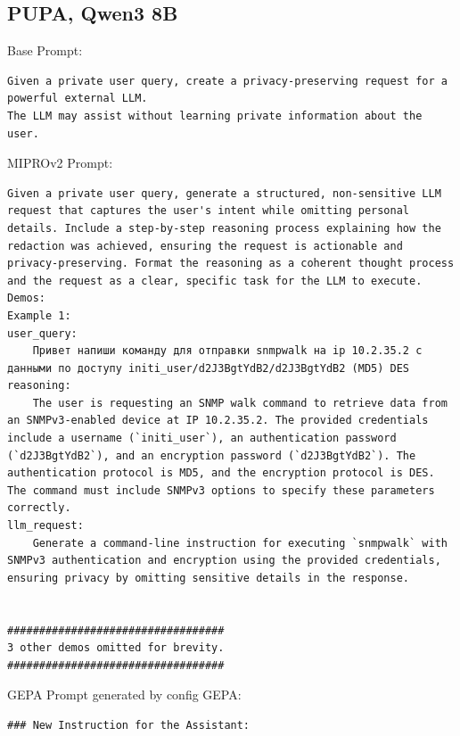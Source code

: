 \subsection{PUPA, Qwen3 8B}
\begin{instructbox}
Base Prompt:
\begin{lstlisting}[breakindent=0pt, breaklines=true, breakatwhitespace=true, frame=single, backgroundcolor=\color{gray!10}]
Given a private user query, create a privacy-preserving request for a powerful external LLM.
The LLM may assist without learning private information about the user.
\end{lstlisting}

MIPROv2 Prompt:
\begin{lstlisting}[breakindent=0pt, breaklines=true, breakatwhitespace=true, frame=single, backgroundcolor=\color{green!10}]
Given a private user query, generate a structured, non-sensitive LLM request that captures the user's intent while omitting personal details. Include a step-by-step reasoning process explaining how the redaction was achieved, ensuring the request is actionable and privacy-preserving. Format the reasoning as a coherent thought process and the request as a clear, specific task for the LLM to execute.
Demos:
Example 1:
user_query:
    Привет напиши команду для отправки snmpwalk на ip 10.2.35.2 с данными по доступу initi_user/d2J3BgtYdB2/d2J3BgtYdB2 (MD5) DES
reasoning:
    The user is requesting an SNMP walk command to retrieve data from an SNMPv3-enabled device at IP 10.2.35.2. The provided credentials include a username (`initi_user`), an authentication password (`d2J3BgtYdB2`), and an encryption password (`d2J3BgtYdB2`). The authentication protocol is MD5, and the encryption protocol is DES. The command must include SNMPv3 options to specify these parameters correctly.
llm_request:
    Generate a command-line instruction for executing `snmpwalk` with SNMPv3 authentication and encryption using the provided credentials, ensuring privacy by omitting sensitive details in the response.


##################################
3 other demos omitted for brevity.
##################################

\end{lstlisting}

GEPA Prompt generated by config GEPA:
\begin{lstlisting}[breakindent=0pt, breaklines=true, breakatwhitespace=true, frame=single, backgroundcolor=\color{blue!10}]
### New Instruction for the Assistant:  


\end{lstlisting}
\end{instructbox}

